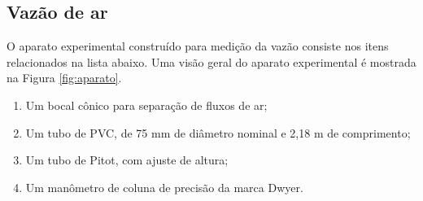 \subsection{Vazão de ar}



O aparato experimental construído para medição da vazão consiste nos itens relacionados na lista abaixo. Uma visão geral do aparato experimental é mostrada na Figura \ref{fig:aparato}.
\begin{enumerate}[noitemsep,nosep,labelindent=\parindent,leftmargin=*,label={\alph*}) ] 
	\item Um bocal cônico para separação de fluxos de ar;
	\item Um tubo de PVC, de 75 mm de diâmetro nominal e 2,18 m de comprimento;
	\item Um tubo de Pitot, com ajuste de altura;
	\item Um manômetro de coluna de precisão da marca Dwyer.
\end{enumerate}

